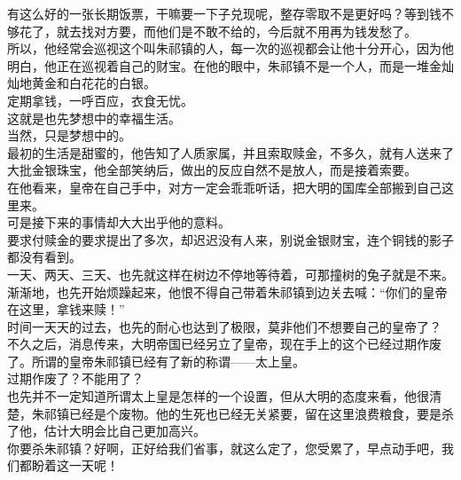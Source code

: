 \begin{multicols}{\theparacolNo}
有这么好的一张长期饭票，干嘛要一下子兑现呢，整存零取不是更好吗？等到钱不够花了，就去找对方要，而他们是不敢不给的，今后就不用再为钱发愁了。\\

所以，他经常会巡视这个叫朱祁镇的人，每一次的巡视都会让他十分开心，因为他明白，他正在巡视着自己的财宝。在他的眼中，朱祁镇不是一个人，而是一堆金灿灿地黄金和白花花的白银。\\

定期拿钱，一呼百应，衣食无忧。\\

这就是也先梦想中的幸福生活。\\

当然，只是梦想中的。\\

最初的生活是甜蜜的，他告知了人质家属，并且索取赎金，不多久，就有人送来了大批金银珠宝，他全部笑纳后，做出的反应自然不是放人，而是接着索要。\\

在他看来，皇帝在自己手中，对方一定会乖乖听话，把大明的国库全部搬到自己这里来。\\

可是接下来的事情却大大出乎他的意料。\\

要求付赎金的要求提出了多次，却迟迟没有人来，别说金银财宝，连个铜钱的影子都没有看到。\\

一天、两天、三天、也先就这样在树边不停地等待着，可那撞树的兔子就是不来。\\

渐渐地，也先开始烦躁起来，他恨不得自己带着朱祁镇到边关去喊：“你们的皇帝在这里，拿钱来赎！”\\

时间一天天的过去，也先的耐心也达到了极限，莫非他们不想要自己的皇帝了？\\

不久之后，消息传来，大明帝国已经另立了皇帝，现在手上的这个已经过期作废了。所谓的皇帝朱祁镇已经有了新的称谓——太上皇。\\

过期作废了？不能用了？\\

也先并不一定知道所谓太上皇是怎样的一个设置，但从大明的态度来看，他很清楚，朱祁镇已经是个废物。他的生死也已经无关紧要，留在这里浪费粮食，要是杀了他，估计大明会比自己更加高兴。\\

你要杀朱祁镇？好啊，正好给我们省事，就这么定了，您受累了，早点动手吧，我们都盼着这一天呢！\\


\end{multicols}
